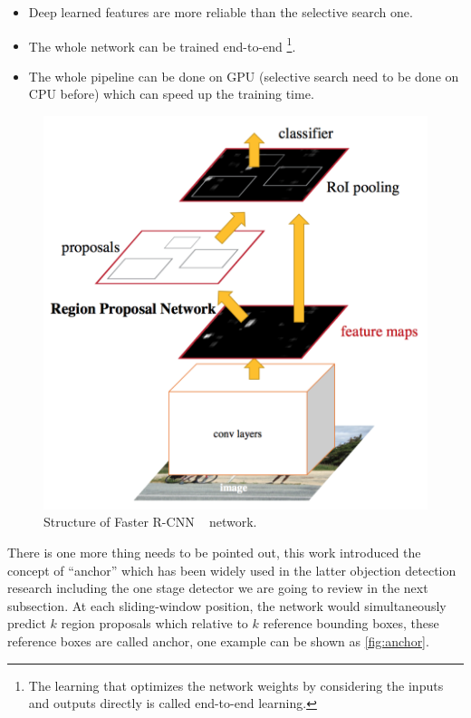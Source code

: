 \begin{itemize}
    \item Deep learned features are more reliable than the selective search one.
    \item The whole network can be trained end-to-end \footnote{The learning 
    that optimizes the network weights by considering the inputs and outputs 
    directly is called end-to-end learning. }.
    \item The whole pipeline can be done on GPU (selective search need to be
    done on CPU before) which can speed up the training time.
\end{itemize}

\begin{figure}
    \begin{center}
        \includegraphics[scale=0.5]{figures/faster_r_cnn.png}
    \end{center}
    \caption{Structure of Faster R-CNN ~\protect\cite{faster-r-cnn-paper-2015} 
    network.}
    \label{fig:faster-r-cnn}
\end{figure}

There is one more thing needs to be pointed out, this work introduced the
concept of ``anchor'' which has been widely
used in the latter objection detection research including the one stage
detector we are going to review in the next subsection.
At each sliding-window position, the network would simultaneously predict $k$
region proposals which relative to
$k$ reference bounding boxes, these reference boxes are called anchor, one example
can be shown as \autoref{fig:anchor}.

